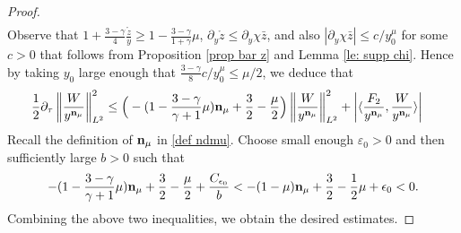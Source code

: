 \documentclass{article}
\newcommand{\norm}[1]{\left\lVert#1\right\rVert}
\newcommand{\ga}{\gamma}
\newcommand{\pa}{\partial}
\newcommand\eps{\varepsilon}
\def\espw{W}
\def\ndmu{{\bf{n}_{\mu}}}
\numberwithin{equation}{section}
\begin{document}
\begin{proof}
\begin{align*}
	\end{align*}
    Observe that $1+\frac{3-\ga}{4}\frac{\mathring z}{y} \ge 1 - \frac{3-\ga}{1+\ga}\mu$,  $\pa_y \mathring z\le \pa_y \chi \bar z$, and also  $|\pa_y \chi \bar z|\le c/y_{0}^\mu $ for some $c>0$ that follows from 
    Proposition \ref{prop bar z} and Lemma \ref{le: supp chi}. Hence by taking $y_0$ large enough that $ \frac{3-\ga}{8} c/y_{0}^\mu \le \mu /2$,  we deduce that
    \begin{align*}
		\frac12 \pa_\tau\norm{\frac{\espw}{y^{\ndmu}}}_{L^2}^2 
		&\leq\Big( -(1-\frac{3-\ga}{\ga+1}\mu )\ndmu +\frac{3}{2}-\frac\mu2 
        \Big)  \norm{\frac{\espw}{y^{\ndmu}}}_{L^2}^2 +\left| \langle \frac{F_2}{y^\ndmu},\frac{\espw}{y^\ndmu} \rangle\right|
	\end{align*}
     Recall the definition of $\ndmu$ in \eqref{def ndmu}. Choose small enough $\eps_0>0$ and then sufficiently large $b>0$ such that 
    \[
    -(1-\frac{3-\ga}{\ga+1}\mu )\ndmu +\frac{3}{2}-\frac{\mu}{2} + \frac{C_{\epsilon_0}}{b}  < -(1-\mu)\ndmu+\frac32-\frac{1}{2}\mu+\epsilon_0 <0. 
    \]
    Combining the above two inequalities, we obtain the desired estimates. 
\end{proof}
\end{document}
